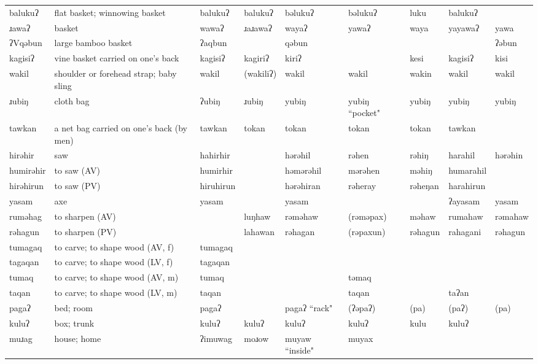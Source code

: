 \begin{landscape}
\begin{longtable}{*{9}{p{}}}
\text{*}balukuʔ & flat basket; winnowing basket & balukuʔ & balukuʔ & bəlukuʔ & bəlukuʔ & luku & balukuʔ & \\
\text{*}ɹawaʔ & basket & wawaʔ & ɹaɹawaʔ & wayaʔ & yawaʔ & waya & yayawaʔ & yawa\\
\text{*}ʔVqəbun & large bamboo basket & ʔaqbun &  & qəbun &  &  &  & ʔəbun\\
\text{*}kagisiʔ & vine basket carried on one's back & kagisiʔ & kagiriʔ & kiriʔ &  & kesi & kagisiʔ & kisi\\
\text{*}wakil & shoulder or forehead strap; baby sling & wakil & (wakiliʔ) & wakil & wakil & wakin & wakil & wakil\\
\text{*}ɹubiŋ & cloth bag & ʔubiŋ & ɹubiŋ & yubiŋ & yubiŋ ``pocket" & yubiŋ & yubiŋ & yubiŋ\\
\text{*}tawkan & a net bag carried on one's back (by men) & tawkan & tokan & tokan & tokan & tokan & tawkan & \\
\text{*}hirəhir & saw & hahirhir &  & hərəhil & rəhen & rəhiŋ & harahil & hərəhin\\
\text{*}humirəhir & to saw (AV) & humirhir &  & həmərəhil & mərəhen & məhiŋ & humarahil & \\
\text{*}hirəhirun & to saw (PV) & hiruhirun &  & hərəhiran & rəheray & rəheŋan & harahirun & \\
\text{*}yasam & axe & yasam &  & yasam &  &  & ʔayasam & yasam\\
\text{*}ruməhag & to sharpen (AV) &  & luŋhaw & rəməhaw & (rəməpax) & məhaw & rumahaw & rəmahaw\\
\text{*}rəhagun & to sharpen (PV) &  & lahawan & rəhagan & (rəpaxun) & rəhagun & rahagani & rəhagun\\
\text{*}tumagaq & to carve; to shape wood (AV, f) & tumagaq &  &  &  &  &  & \\
\text{*}tagaqan & to carve; to shape wood (LV, f) & tagaqan &  &  &  &  &  & \\
\text{*}tumaq & to carve; to shape wood (AV, m) & tumaq &  &  & təmaq &  &  & \\
\text{*}taqan & to carve; to shape wood (LV, m) & taqan &  &  & taqan &  & taʔan & \\
\text{*}pagaʔ & bed; room & pagaʔ &  & pagaʔ ``rack" & (ʔəpaʔ) & (pa) & (paʔ) & (pa)\\
\text{*}kuluʔ & box; trunk & kuluʔ & kuluʔ & kuluʔ & kuluʔ & kulu & kuluʔ & \\
\text{*}muɹag & house; home & ʔimuwag & moɹow & muyaw ``inside" & muyax &  &  & \\

\end{longtable}
\end{landscape}
